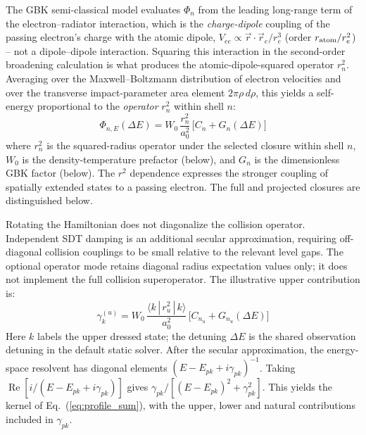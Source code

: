 \documentclass[11pt,a4paper]{article}
\numberwithin{equation}{section}
\begin{document}
The GBK semi-classical model \cite{griembaranger,griem1959} evaluates $\Phi_n$ from the leading long-range term of the electron--radiator interaction, which is the \emph{charge-dipole} coupling of the passing electron's charge with the atomic dipole, $V_{ee} \propto \vec r\cdot\vec r_e/r_e^3$ (order $r_{\rm atom}/r_e^2$) -- not a dipole--dipole interaction.  Squaring this interaction in the second-order broadening calculation is what produces the atomic-dipole-squared operator $r_n^2$.  Averaging over the Maxwell--Boltzmann distribution of electron velocities and over the transverse impact-parameter area element $2\pi\rho\,d\rho$, this yields a self-energy proportional to the \emph{operator} $r_n^2$ within shell $n$:
\begin{equation}
\label{eq:phi_r2}
\Phi_{n,E}(\Delta E) = W_0\,\frac{r_n^2}{a_0^2}\,\bigl[C_n + G_n(\Delta E)\bigr]
\end{equation}
where $r_n^2$ is the squared-radius operator under the selected closure within shell $n$, $W_0$ is the density-temperature prefactor (below), and $G_n$ is the dimensionless GBK factor (below). The $r^2$ dependence expresses the stronger coupling of spatially extended states to a passing electron. The full and projected closures are distinguished below.

Rotating the Hamiltonian does not diagonalize the collision operator. Independent SDT damping is an additional secular approximation, requiring off-diagonal collision couplings to be small relative to the relevant level gaps. The optional operator mode retains diagonal radius expectation values only; it does not implement the full collision superoperator. The illustrative upper contribution is:
\begin{equation}
\label{eq:gamma_k}
\gamma_k^{(u)} = W_0\,\frac{\langle k\,|\,r_u^2\,|\,k\rangle}{a_0^2}\,\bigl[C_{n_u} + G_{n_u}(\Delta E)\bigr]
\end{equation}
Here $k$ labels the upper dressed state; the detuning $\Delta E$ is the shared observation detuning in the default static solver. After the secular approximation, the energy-space resolvent has diagonal elements $(E-E_{pk}+i\gamma_{pk})^{-1}$. Taking $\operatorname{Re}[i/(E-E_{pk}+i\gamma_{pk})]$ gives $\gamma_{pk}/[(E-E_{pk})^2+\gamma_{pk}^2]$. This yields the kernel of Eq.~(\ref{eq:profile_sum}), with the upper, lower and natural contributions included in $\gamma_{pk}$.
\end{document}
